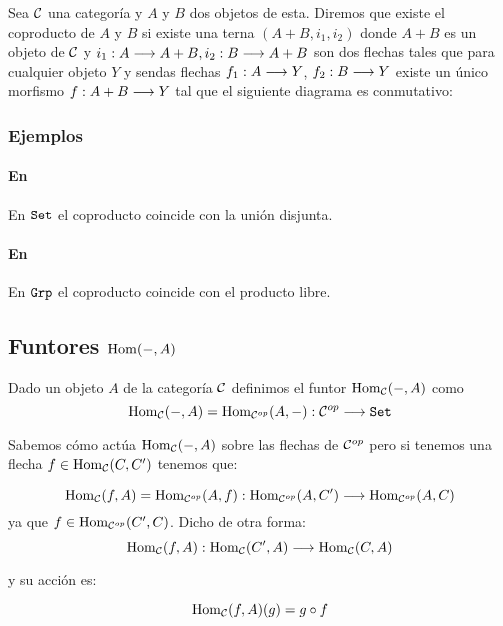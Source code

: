 \begin{definition}
Sea $\mathcal{C}$ una categoría y $A$ y $B$ dos objetos de esta. Diremos que
existe el coproducto de $A$ y $B$
si existe una terna $(A+B, i_1, i_2)$
donde $A+B$ es un objeto de $\mathcal{C}$ y
$i_1 : A\longrightarrow A+B, i_2 : B\longrightarrow A+B$ son dos flechas tales
que para cualquier objeto $Y$ y sendas flechas $f_1 : A\longrightarrow Y$,
$f_2 : B\longrightarrow Y$ existe un único morfismo
$f : A+B\longrightarrow Y$ tal que el siguiente diagrama es conmutativo:
\begin{center}
\end{center}
\end{definition}

\subsubsection{Ejemplos}
\paragraph{En \Set}
En $\texttt{Set}$ el coproducto coincide con la unión disjunta.

\paragraph{En \Grp}
En $\texttt{Grp} $ el coproducto coincide con el producto libre.

\subsection{Funtores $\operatorname{Hom}(-, A)$}
Dado un objeto $A$ de la categoría $\mathcal{C}$ definimos el funtor
$\operatorname{Hom}_{\mathcal{C}}(-, A)$ como
$$\operatorname{Hom}_{\mathcal{C}}(-, A) = \operatorname{Hom}_{\mathcal{C}^{op}}(A, -) : \mathcal{C}^{op}\longrightarrow \texttt{Set}$$

Sabemos cómo actúa $\operatorname{Hom}_{\mathcal{C}}(-, A)$ sobre las flechas de $\mathcal{C}^{op}$
pero si tenemos una flecha $f \in \operatorname{Hom}_{\mathcal{C}}(C, C')$ tenemos que:

$$\operatorname{Hom}_{\mathcal{C}}(f, A) = \operatorname{Hom}_{\mathcal{C}^{op}}(A, f) :
  \operatorname{Hom}_{\mathcal{C}^{op}}(A, C')\longrightarrow \operatorname{Hom}_{\mathcal{C}^{op}}(A, C)$$
ya que $f \in \operatorname{Hom}_{\mathcal{C}^{op}}(C', C)$. Dicho de otra forma:
$$\operatorname{Hom}_{\mathcal{C}}(f, A) : \operatorname{Hom}_{\mathcal{C}}(C', A)\longrightarrow \operatorname{Hom}_{\mathcal{C}}(C, A)$$

y su acción es:

$$\operatorname{Hom}_{\mathcal{C}}(f, A)(g) = g\circ f$$

